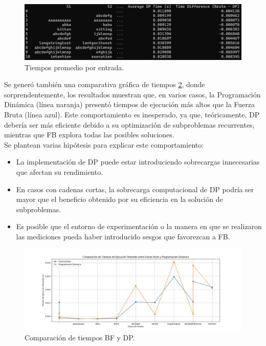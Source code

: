\begin{figure}[H]
    \centering
    \includegraphics[width=\textwidth]{images/times.png}
    \caption{Tiempos promedio por entrada.}
    \label{times}
\end{figure}

\noindent Se generó también una comparativa gráfica de tiempos \cref{compTimes}, donde sorprendentemente, los resultados muestran que, en varios casos, la Programación Dinámica (línea naranja) presentó tiempos de ejecución más altos que la Fuerza Bruta (línea azul). Este comportamiento es inesperado, ya que, teóricamente, DP debería ser más eficiente debido a su optimización de subproblemas recurrentes, mientras que FB explora todas las posibles soluciones.\\

Se plantean varias hipótesis para explicar este comportamiento:

    \begin{itemize}
        \item La implementación de DP puede estar introduciendo sobrecargas innecesarias que afectan su rendimiento.
        \item En casos con cadenas cortas, la sobrecarga computacional de DP podría ser mayor que el beneficio obtenido por su eficiencia en la solución de subproblemas.
        \item Es posible que el entorno de experimentación o la manera en que se realizaron las mediciones pueda haber introducido sesgos que favorezcan a FB.
    \end{itemize}

\begin{figure}[H]
    \centering
    \includegraphics[width=\textwidth]{images/comparison_execution_times.png}
    \caption{Comparación de tiempos BF y DP.}
    \label{compTimes}
\end{figure}
\newpage

